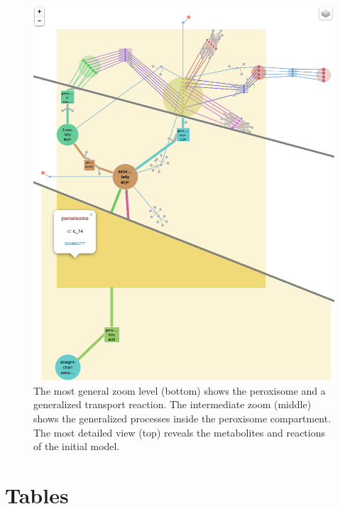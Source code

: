 \documentclass{bmcart}
\begin{document}
\begin{backmatter}
  \begin{figure}[h!]
 \includegraphics[scale=0.41]{figure_main.png}
  \caption{
  \label{fig:zoom_levels}  
      The most general zoom level (bottom) shows the peroxisome and a generalized transport reaction. The intermediate zoom (middle) shows the generalized processes inside the peroxisome compartment. The most detailed view (top) reveals the metabolites and reactions of the initial model.}
      \end{figure}


\section*{Tables}


\end{backmatter}
\end{document}

